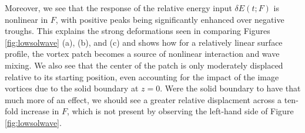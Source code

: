 \documentclass[a4paper,11pt]{article}
\begin{document}
Moreover, we see that the response of the relative energy input $\delta E(t;F)$ is nonlinear in $F$, with positive peaks being significantly enhanced over negative troughs.  This explains the strong deformations seen in comparing Figures \ref{fig:lowsolwave} (a), (b), and (c) and shows how for a relatively linear surface profile, the vortex patch becomes a source of nonlinear interaction and wave mixing.    We also see that the center of the patch is only moderately displaced relative to its starting position, even accounting for the impact of the image vortices due to the solid boundary at $z=0$.  Were the solid boundary to have that much more of an effect, we should see a greater relative displacment across a ten-fold increase in $F$, which is not present by observing the left-hand side of Figure \ref{fig:lowsolwave}.
\end{document}
